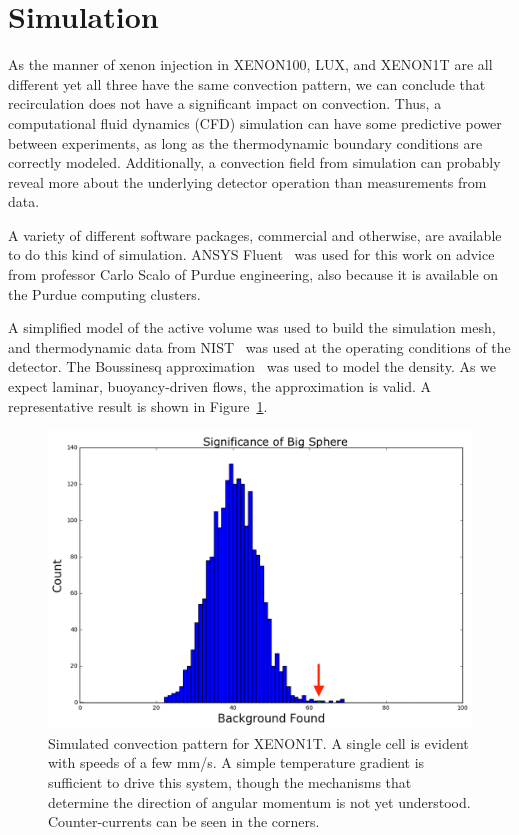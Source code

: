 \section{Simulation}

As the manner of xenon injection in XENON100, LUX, and XENON1T are all different yet all three have the same convection pattern, we can conclude that recirculation does not have a significant impact on convection. Thus, a computational fluid dynamics (CFD) simulation can have some predictive power between experiments, as long as the thermodynamic boundary conditions are correctly modeled. Additionally, a convection field from simulation can probably reveal more about the underlying detector operation than measurements from data.

A variety of different software packages, commercial and otherwise, are available to do this kind of simulation. ANSYS Fluent~\cite{fluent} was used for this work on advice from professor Carlo Scalo of Purdue engineering, also because it is available on the Purdue computing clusters.

A simplified model of the active volume was used to build the simulation mesh, and thermodynamic data from NIST~\cite{NIST} was used at the operating conditions of the detector. The Boussinesq approximation~\cite{Boussinesq:1897} was used to model the density. As we expect laminar, buoyancy-driven flows, the approximation is valid. A representative result is shown in Figure~\ref{fig:cfd_sample}.

\begin{figure}[htb]
    \includegraphics[width=\textwidth]{figures/rnveto/BigSphere}
    \caption{Simulated convection pattern for XENON1T. A single cell is evident with speeds of a few mm/s. A simple temperature gradient is sufficient to drive this system, though the mechanisms that determine the direction of angular momentum is not yet understood. Counter-currents can be seen in the corners.}\label{fig:cfd_sample}
\end{figure}

